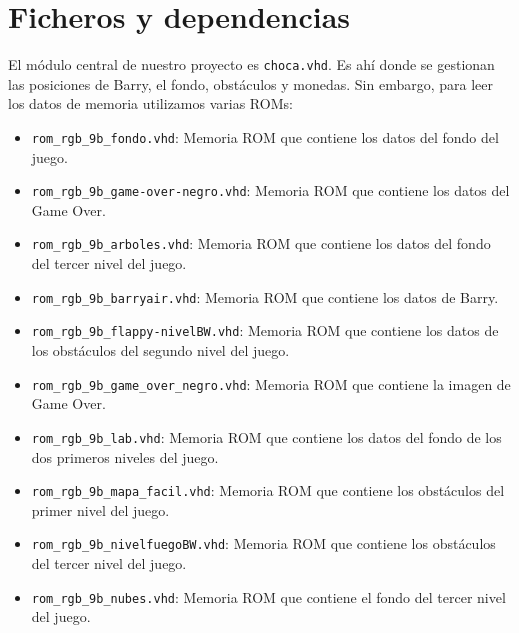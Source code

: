 \documentclass[11pt, a4paper, spanish, openright, twoside]{book}
\begin{document}
\newpage
\mbox{}
\thispagestyle{empty}						%
\newpage


\tableofcontents 							%

\newpage
\mbox{}
\thispagestyle{empty}						%
\newpage


\vspace{3cm}


\section{Ficheros y dependencias}
El módulo central de nuestro proyecto es \texttt{choca.vhd}. Es ahí donde se gestionan las posiciones de Barry, el fondo, obstáculos y monedas. Sin embargo, para leer los datos de memoria utilizamos varias ROMs:

\begin{itemize}

	\item \texttt{rom\_rgb\_9b\_fondo.vhd}: Memoria ROM que contiene los datos del fondo del juego.
	\item \texttt{rom\_rgb\_9b\_game-over-negro.vhd}: Memoria ROM que contiene los datos del Game Over.
	\item \texttt{rom\_rgb\_9b\_arboles.vhd}: Memoria ROM que contiene los datos del fondo del tercer nivel del juego.
	\item \texttt{rom\_rgb\_9b\_barryair.vhd}: Memoria ROM que contiene los datos de Barry.
	\item \texttt{rom\_rgb\_9b\_flappy-nivelBW.vhd}: Memoria ROM que contiene los datos de los obstáculos del segundo nivel del juego.
	\item \texttt{rom\_rgb\_9b\_game\_over\_negro.vhd}: Memoria ROM que contiene la imagen de Game Over.
	\item \texttt{rom\_rgb\_9b\_lab.vhd}: Memoria ROM que contiene los datos del fondo de los dos primeros niveles del juego.
	\item \texttt{rom\_rgb\_9b\_mapa\_facil.vhd}: Memoria ROM que contiene los obstáculos del primer nivel del juego.
	\item \texttt{rom\_rgb\_9b\_nivelfuegoBW.vhd}: Memoria ROM que contiene los obstáculos del tercer nivel del juego.
	\item \texttt{rom\_rgb\_9b\_nubes.vhd}: Memoria ROM que contiene el fondo del tercer nivel del juego.
	
\end{itemize}
\end{document}
